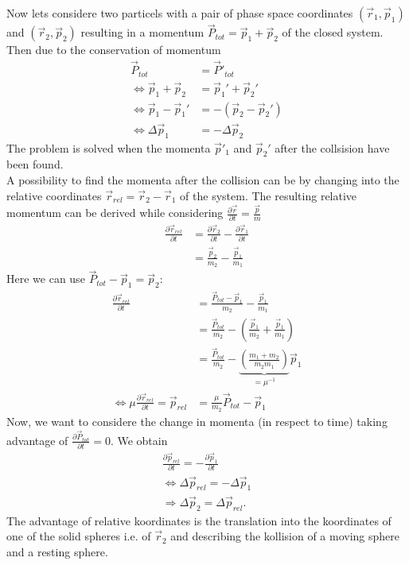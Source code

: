 \documentclass{article}
\begin{document}
    Now lets considere two particels with a pair of phase space coordinates $(\vec{r}_1, \vec{p}_1)$ and $(\vec{r}_2, \vec{p}_2)$ resulting in a momentum $\vec{P}_{tot}=\vec{p}_1+\vec{p}_2$ of the closed system. Then due to the conservation of momentum 
    \begin{align*}
        \vec{P}_{tot}&=\vec{P}'_{tot} \\
        \Leftrightarrow \vec{p}_1+\vec{p}_2&= \vec{p}_1'+\vec{p}_2' \\
        \Leftrightarrow \vec{p}_1 - \vec{p}_1' &= - (\vec{p}_2 - \vec{p}_2') \\
        \Leftrightarrow \Delta \vec{p}_1 &= -\Delta\vec{p}_2
    \end{align*}
    The problem is solved when the momenta $\vec{p}'_1$ and $\vec{p}_2'$ after the collsision have been found.\\ %

    A possibility to find the momenta after the collision can be by changing into the relative coordinates $\vec{r}_{rel}=\vec{r}_2-\vec{r}_1$ of the system. 
    The resulting relative momentum can be derived while considering $\frac{\partial \vec{r}}{\partial t}=\frac{\vec{p}}{m}$ 
    \begin{align*}
        \frac{\partial \vec{r}_{rel}}{\partial t}&= \frac{\partial \vec{r}_2}{\partial t}-\frac{\partial \vec{r}_1}{\partial t} \\
        &=\frac{\vec{p}_2}{m_2}-\frac{\vec{p}_1}{m_1} 
    \end{align*}
    Here we can use $\vec{P}_{tot}-\vec{p}_1=\vec{p}_2$:
    \begin{align*}
        \frac{\partial \vec{r}_{rel}}{\partial t} &= \frac{\vec{P}_{tot}-\vec{p}_1}{m_2} - \frac{\vec{p}_1}{m_1} \\
        &= \frac{\vec{P}_{tot}}{m_2} - \left(\frac{\vec{p}_1}{m_2}+\frac{\vec{p}_1}{m_1}\right) \\
        &= \frac{\vec{P}_{tot}}{m_2} - \underset{=\mu^{-1}}{\underbrace{\left(\frac{m_1+m_2}{m_2m_1}\right)}}  \vec{p}_1 \\
        \Leftrightarrow \mu \frac{\partial \vec{r}_{rel}}{\partial t}= \vec{p}_{rel} &= \frac{\mu}{m_2} \vec{P}_{tot} - \vec{p}_1
    \end{align*} 
    Now, we want to considere the change in momenta (in respect to time) taking advantage of $\frac{\partial \vec{P}_{tot}}{\partial t}=0$. We obtain
    \begin{align*}
        \frac{\partial \vec{p}_{rel}}{\partial t} =-\frac{\partial \vec{p}_1}{\partial t} \\
        \Leftrightarrow \Delta \vec{p}_{rel} =-\Delta \vec{p}_1 \\
        \Rightarrow \Delta \vec{p}_2 = \Delta\vec{p}_{rel}.
    \end{align*}
    The advantage of relative koordinates is the translation into the koordinates of one of the solid spheres i.e. of $\vec{r}_2$ and describing the kollision of a moving sphere and a resting sphere. \\
\end{document}
